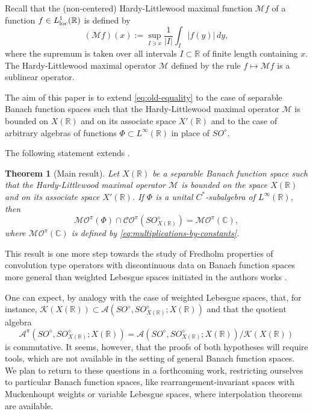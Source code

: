 \documentclass{birkjour}
\newtheorem{theorem}{Theorem}[section]
\numberwithin{equation}{section}
\newcommand{\C}{\mathbb{C}}
\newcommand{\R}{\mathbb{R}}
\newcommand{\cA}{\mathcal{A}}
\newcommand{\cK}{\mathcal{K}}
\newcommand{\cM}{\mathcal{M}}
\begin{document}
Recall that the {(non-centered)} Hardy-Littlewood maximal function $\cM f$
of a function $f\in L_{\rm loc}^1(\R)$ is defined by
\[
(\cM f)(x):=\sup_{I\ni x}\frac{1}{|I|}\int_I|f(y)|\,dy,
\]
where the supremum is taken over all intervals $I\subset\R$ of finite length
containing $x$. The Hardy-Littlewood maximal operator $\cM$ defined by the rule
$f\mapsto \cM f$ is a sublinear operator.

The aim of this paper is to extend \eqref{eq:old-equality} to the case of
separable Banach function spaces such that the Hardy-Littlewood maximal
operator $\cM$ is bounded on $X(\R)$ and on its associate space $X'(\R)$
{and to}
the case of arbitrary algebras of functions $\Phi\subset L^\infty(\R)$
in place of {$SO^\diamond$.}

The following statement extends \cite[Lemma~4.3]{K17}.
\begin{theorem}[Main result]
\label{th:intersection-quotient-algebras}
Let $X(\R)$ be a separable Banach function space such that the Hardy-Littlewood
maximal operator $\cM$ is bounded on the space $X(\R)$ and on its associate
space $X'(\R)$. If $\Phi$ is a unital $C^*$-subalgebra of
{$L^\infty(\R)$, then}
\begin{equation}\label{eq:intersection-quotient-algebras-1}
\mathcal{MO}^\pi(\Phi)
\cap
\mathcal{CO}^\pi{(SO_{X(\R)}^\diamond)}
=\mathcal{MO}^\pi(\C),
\end{equation}
where $\mathcal{MO}^\pi(\C)$ is defined by
\eqref{eq:multiplications-by-constants}.
\end{theorem}
This result is one more step towards the study of Fredholm properties of
convolution type operators with discontinuous data on Banach function spaces
more general than weighted Lebesgue spaces initiated in the authors works
\cite{FKK-AFA,FKK-FS12,FKK-ISAAC19}.

One can expect, by analogy with the case of weighted Lebesgue spaces,
that, for instance,
$\cK(X(\R))\subset\cA(SO^\diamond,SO_{X(\R)}^\diamond;X(\R))$
and that the quotient algebra
\[
\cA^\pi(SO^\diamond,SO_{X(\R)}^\diamond;X(\R))
=
\cA(SO^\diamond,SO_{X(\R)}^\diamond;X(\R))/\cK(X(\R))
\]
is commutative. It seems, however, that the proofs of both hypotheses will
require tools, which are not available in the setting of general Banach
function spaces. We plan to return to these questions in a forthcoming
work, restricting ourselves to particular Banach function spaces, like
rearrangement-invariant spaces with Muckenhoupt weights or variable Lebesgue
spaces, where interpolation theorems are available.
\end{document}
